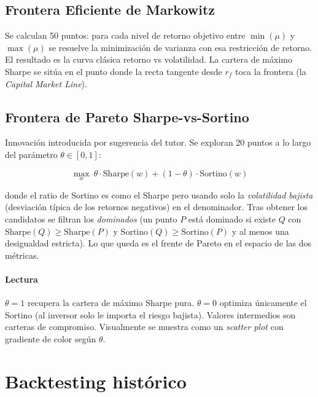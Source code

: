 \documentclass[11pt,a4paper]{article}
\begin{document}
\subsection{Frontera Eficiente de Markowitz}

Se calculan 50 puntos: para cada nivel de retorno objetivo entre $\min(\mu)$ y $\max(\mu)$ se resuelve la minimización de varianza con esa restricción de retorno. El resultado es la curva clásica retorno vs volatilidad. La cartera de máximo Sharpe se sitúa en el punto donde la recta tangente desde $r_f$ toca la frontera (la \textit{Capital Market Line}).

\subsection{Frontera de Pareto Sharpe-vs-Sortino}

Innovación introducida por sugerencia del tutor. Se exploran 20 puntos a lo largo del parámetro $\theta \in [0,1]$:

\begin{equation}
\max_w\ \theta \cdot \mathrm{Sharpe}(w) + (1-\theta) \cdot \mathrm{Sortino}(w)
\end{equation}

donde el ratio de Sortino es como el Sharpe pero usando solo la \textit{volatilidad bajista} (desviación típica de los retornos negativos) en el denominador. Tras obtener los candidatos se filtran los \textit{dominados} (un punto $P$ está dominado si existe $Q$ con $\mathrm{Sharpe}(Q) \ge \mathrm{Sharpe}(P)$ y $\mathrm{Sortino}(Q) \ge \mathrm{Sortino}(P)$ y al menos una desigualdad estricta). Lo que queda es el frente de Pareto en el espacio de las dos métricas.

\paragraph{Lectura}
$\theta=1$ recupera la cartera de máximo Sharpe pura. $\theta=0$ optimiza únicamente el Sortino (al inversor solo le importa el riesgo bajista). Valores intermedios son carteras de compromiso. Visualmente se muestra como un \textit{scatter plot} con gradiente de color según $\theta$.

\section{Backtesting histórico}
\end{document}
